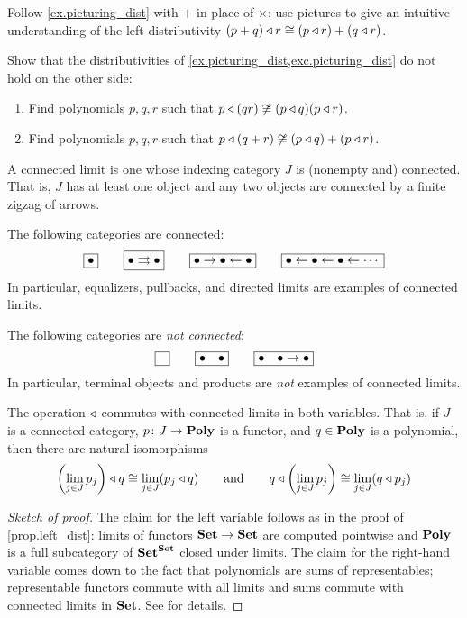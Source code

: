\documentclass[Book-Poly]{subfiles}
\begin{document}
\begin{exercise}\label{exc.picturing_dist}
Follow \cref{ex.picturing_dist} with $+$ in place of $\times$: use pictures to give an intuitive understanding of the left-distributivity $(p+q)\mathbin{\triangleleft} r\cong (p\mathbin{\triangleleft} r)+(q\mathbin{\triangleleft} r)$.
\end{exercise}

\begin{exercise}
Show that the distributivities of \cref{ex.picturing_dist,exc.picturing_dist} do not hold on the other side:
\begin{enumerate}
	\item Find polynomials $p,q,r$ such that $p\mathbin{\triangleleft} (qr)\not\cong(p\mathbin{\triangleleft} q)(p\mathbin{\triangleleft} r)$.
	\item Find polynomials $p,q,r$ such that $p\mathbin{\triangleleft} (q+r)\not\cong(p\mathbin{\triangleleft} q)+(p\mathbin{\triangleleft} r)$.
\qedhere
\end{enumerate}
\end{exercise}

A connected limit is one whose indexing category $J$ is (nonempty and) connected. That is, $J$ has at least one object and any two objects are connected by a finite zigzag of arrows.

\begin{example}
The following categories are connected:
\[
\fbox{$\bullet$}
\qquad
\fbox{$\bullet\rightrightarrows\bullet$}
\qquad
\fbox{$\bullet\to\bullet\leftarrow\bullet$}
\qquad
\fbox{$\bullet\leftarrow\bullet\leftarrow\bullet\leftarrow\cdots$}
\]
In particular, equalizers, pullbacks, and directed limits are examples of connected limits. 

The following categories are \emph{not connected}:
\[
\fbox{$\phantom{\bullet}$}
\qquad
\fbox{$\bullet\quad\bullet$}
\qquad
\fbox{$\bullet\quad\bullet\to \bullet$}
\]
In particular, terminal objects and products are \emph{not} examples of connected limits.
\end{example}

\begin{theorem}\label{thm.connected_limits}
The operation $\mathbin{\triangleleft}$ commutes with connected limits in both variables. That is, if $J$ is a connected category, $p\colon J\to\mathbf{Poly}$ is a functor, and $q\in\mathbf{Poly}$ is a polynomial, then there are natural isomorphisms
\[
	\left(\lim_{j\in J} p_j\right)\mathbin{\triangleleft} q\cong \lim_{j\in J}(p_j\mathbin{\triangleleft} q)
	\qquad\text{and}\qquad
	q\mathbin{\triangleleft}\left(\lim_{j\in J} p_j\right)\cong \lim_{j\in J}(q\mathbin{\triangleleft} p_j)
\]
\end{theorem}
\begin{proof}[Sketch of proof]
The claim for the left variable follows as in the proof of \cref{prop.left_dist}: limits of functors $\mathbf{Set}\to\mathbf{Set}$ are computed pointwise and $\mathbf{Poly}$ is a full subcategory of $\mathbf{Set}^{\mathbf{Set}}$ closed under limits. The claim for the right-hand variable comes down to the fact that polynomials are sums of representables; representable functors commute with all limits and sums commute with connected limits in $\mathbf{Set}$. See \cite[Proposition 1.6]{kock2012polynomial} for details.
\end{proof}
\end{document}
